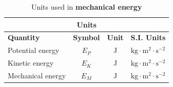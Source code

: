     \par
\begin{table}[H]
\begin{center}
\begin{tabular}{|l|c|c|c|}\hline \hline 
\multicolumn{4}{|c|}{\textbf{Units}}\\ \hline \hline
\textbf{Quantity} & \textbf{Symbol} & \textbf{Unit} & \textbf{S.I. Units}\\ \hline
Potential energy & $E_{P}$ & J & $\text{kg} \cdot \text{m}^{2} \cdot \text{s}^{-2}$ \\ \hline
Kinetic energy & $E_{K}$ & J & $\text{kg} \cdot \text{m}^{2} \cdot \text{s}^{-2}$ \\ \hline
Mechanical energy & $E_{M}$ & J & $\text{kg} \cdot \text{m}^{2} \cdot \text{s}^{-2}$ \\ \hline
\end{tabular}
\end{center}
\caption{Units used in \textbf{mechanical energy} }
\label{table:electricity::units}
\end{table}
    \label{m38786*cid9}
